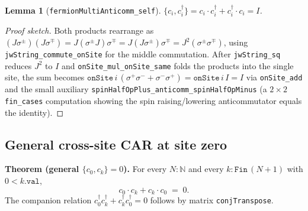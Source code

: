 \documentclass[a4paper,11pt]{article}
\newtheorem{lemma}[theorem]{Lemma}
\begin{document}
\begin{lemma}[\texttt{fermionMultiAnticomm\_self}]
$\{c_i, c_i^\dagger\} = c_i \cdot c_i^\dagger + c_i^\dagger \cdot c_i = I$.
\end{lemma}

\begin{proof}[Proof sketch]
Both products rearrange as
$(J \sigma^\pm)(J \sigma^\mp)
 = J (\sigma^\pm J) \sigma^\mp
 = J (J \sigma^\pm) \sigma^\mp
 = J^2 (\sigma^\pm \sigma^\mp)$,
using \texttt{jwString\_commute\_onSite} for the middle commutation.
After \texttt{jwString\_sq} reduces $J^2$ to $I$ and
\texttt{onSite\_mul\_onSite\_same} folds the products into the single
site, the sum becomes
$\texttt{onSite}\,i\,(\sigma^+\sigma^- + \sigma^-\sigma^+)
 = \texttt{onSite}\,i\,I = I$
via \texttt{onSite\_add} and the small auxiliary
\texttt{spinHalfOpPlus\_anticomm\_spinHalfOpMinus} (a $2\times 2$
\texttt{fin\_cases} computation showing the spin raising/lowering
anticommutator equals the identity).
\end{proof}

\subsection*{General cross-site CAR at site zero}

\noindent\textbf{Theorem (general \(\{c_0, c_k\} = 0\)).} For every
\(N : \mathbb{N}\) and every \(k : \texttt{Fin}\,(N + 1)\) with
\(0 < k.\texttt{val}\),
\[
  c_0 \cdot c_k + c_k \cdot c_0 \;=\; 0.
\]
The companion relation \(c_0^\dagger c_k^\dagger + c_k^\dagger c_0^\dagger = 0\)
follows by matrix \texttt{conjTranspose}.
\end{document}
